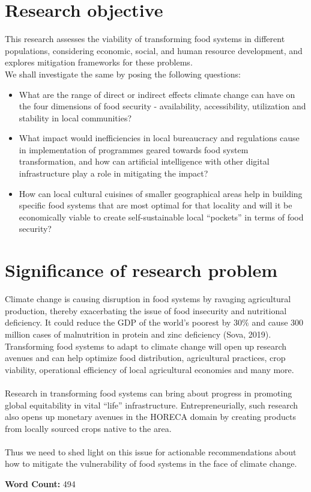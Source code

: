 \documentclass[12pt, twoside]{report}
\begin{document}
\begin{multicols}{2}
\section*{Research objective}%
This research assesses the viability of transforming food systems in different populations, considering economic, social, and human resource development, and explores mitigation frameworks for these problems. \\ 
We shall investigate the same by posing the following questions:
\begin{itemize}
	\item What are the range of direct or indirect effects climate change can have on the four dimensions of food security - availability, accessibility, utilization and stability in local communities?
	\item What impact would inefficiencies in local bureaucracy and regulations cause in implementation of programmes geared towards food system transformation, and how can artificial intelligence with other digital infrastructure play a role in mitigating the impact?
	\item How can local cultural cuisines of smaller geographical areas help in building specific food systems that are most optimal for that locality and will it be economically viable to create self-sustainable local “pockets” in terms of food security?
\end{itemize}

\section*{Significance of research problem}%
Climate change is causing disruption in food systems by ravaging agricultural production, thereby exacerbating the issue of food insecurity and nutritional deficiency. It could reduce the GDP of the world’s poorest by $ 30 \% $ and cause $ 300 $ million cases of malnutrition in protein and zinc deficiency (Sova, 2019). \\
Transforming food systems to adapt to climate change will open up research avenues and can help optimize food distribution, agricultural practices, crop viability, operational efficiency of local agricultural economies and many more. \\ \\
Research in transforming food systems can bring about progress in promoting global equitability in vital ``life'' infrastructure. Entrepreneurially, such research also opens up monetary avenues in the HORECA domain by creating products from locally sourced crops native to the area. \\ \\
Thus we need to shed light on this issue for actionable recommendations about how to mitigate the vulnerability of food systems in the face of climate change.

\end{multicols}

\flushright
\textbf{Word Count:} 494



\nocite{gregory2005}
\nocite{sova2019}
\nocite{wheeler2013}
\end{document}
